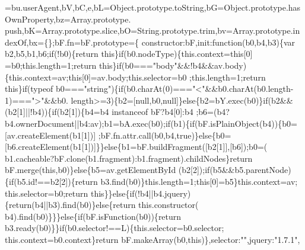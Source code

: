 \begin{DoxyCode}
      =bu.userAgent,bV,bC,e,bL=Object.prototype.toString,bG=Object.prototype.hasOwnProperty,bz=Array.prototype.
      push,bK=Array.prototype.slice,bO=String.prototype.trim,bv=Array.prototype.indexOf,bx=\{\};bF.fn=bF.prototype=\{
      constructor:bF,init:\textcolor{keyword}{function}(b0,b4,b3)\{var b2,b5,b1,b6;\textcolor{keywordflow}{if}(!b0)\{\textcolor{keywordflow}{return} \textcolor{keyword}{this}\}\textcolor{keywordflow}{if}(b0.nodeType)\{this.context=\textcolor{keyword}{this}[0]
      =b0;this.length=1;\textcolor{keywordflow}{return} \textcolor{keyword}{this}\}\textcolor{keywordflow}{if}(b0===\textcolor{stringliteral}{"body"}&&!b4&&av.body)\{this.context=av;\textcolor{keyword}{this}[0]=av.body;this.selector=b0
      ;this.length=1;\textcolor{keywordflow}{return} \textcolor{keyword}{this}\}\textcolor{keywordflow}{if}(typeof b0===\textcolor{stringliteral}{"string"})\{\textcolor{keywordflow}{if}(b0.charAt(0)===\textcolor{stringliteral}{"<"}&&b0.charAt(b0.length-1)===\textcolor{stringliteral}{">"}&&b0.
      length>=3)\{b2=[null,b0,null]\}\textcolor{keywordflow}{else}\{b2=bY.exec(b0)\}\textcolor{keywordflow}{if}(b2&&(b2[1]||!b4))\{\textcolor{keywordflow}{if}(b2[1])\{b4=b4 instanceof bF?b4[0]:b4
      ;b6=(b4?b4.ownerDocument||b4:av);b1=bA.exec(b0);\textcolor{keywordflow}{if}(b1)\{\textcolor{keywordflow}{if}(bF.isPlainObject(b4))\{b0=[av.createElement(b1[1])]
      ;bF.fn.attr.call(b0,b4,\textcolor{keyword}{true})\}\textcolor{keywordflow}{else}\{b0=[b6.createElement(b1[1])]\}\}\textcolor{keywordflow}{else}\{b1=bF.buildFragment([b2[1]],[b6]);b0=(
      b1.cacheable?bF.clone(b1.fragment):b1.fragment).childNodes\}\textcolor{keywordflow}{return} bF.merge(\textcolor{keyword}{this},b0)\}\textcolor{keywordflow}{else}\{b5=av.getElementById
      (b2[2]);\textcolor{keywordflow}{if}(b5&&b5.parentNode)\{\textcolor{keywordflow}{if}(b5.id!==b2[2])\{\textcolor{keywordflow}{return} b3.find(b0)\}this.length=1;\textcolor{keyword}{this}[0]=b5\}this.context=av;
      this.selector=b0;\textcolor{keywordflow}{return} \textcolor{keyword}{this}\}\}\textcolor{keywordflow}{else}\{\textcolor{keywordflow}{if}(!b4||b4.jquery)\{\textcolor{keywordflow}{return}(b4||b3).find(b0)\}\textcolor{keywordflow}{else}\{\textcolor{keywordflow}{return} this.constructor(
      b4).find(b0)\}\}\}\textcolor{keywordflow}{else}\{\textcolor{keywordflow}{if}(bF.isFunction(b0))\{\textcolor{keywordflow}{return} b3.ready(b0)\}\}\textcolor{keywordflow}{if}(b0.selector!==L)\{this.selector=b0.selector;
      this.context=b0.context\}\textcolor{keywordflow}{return} bF.makeArray(b0,\textcolor{keyword}{this})\},selector:\textcolor{stringliteral}{""},jquery:\textcolor{stringliteral}{"1.7.1"},

\end{DoxyCode}
